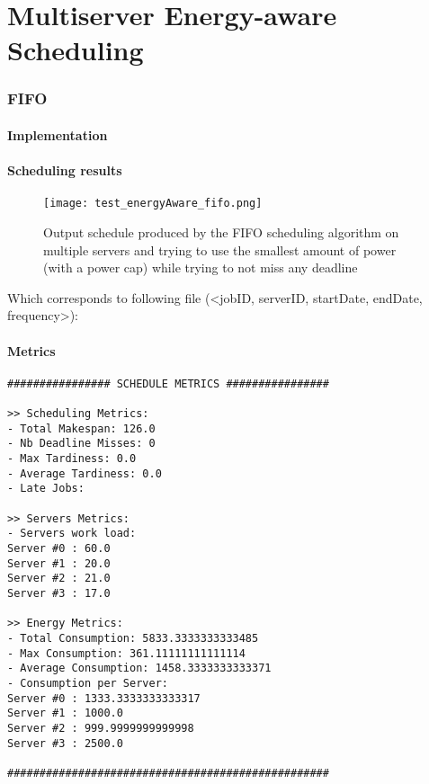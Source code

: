 \documentclass[./report.tex]{subfiles}
\begin{document}
\part{Multiserver Energy-aware Scheduling}


\newpage
\section{FIFO}
\subsection{Implementation}

\subsection{Scheduling results}
\begin{figure}[!h]
	\center
	\texttt{[image: test\_energyAware\_fifo.png]}
	\caption{Output schedule produced by the FIFO scheduling algorithm on multiple servers and trying to use the smallest amount of power (with a power cap) while trying to not miss any deadline}
	\label{fig:energyAware_fifo} 
\end{figure}

Which corresponds to following file (<jobID, serverID, startDate, endDate, frequency>):


\newpage
\subsection{Metrics}
\begin{lstlisting}[style=txt, caption={Metrics for FIFO on multiple energy aware servers}]
################ SCHEDULE METRICS ################

>> Scheduling Metrics: 
- Total Makespan: 126.0
- Nb Deadline Misses: 0
- Max Tardiness: 0.0
- Average Tardiness: 0.0
- Late Jobs: 

>> Servers Metrics: 
- Servers work load:
Server #0 : 60.0
Server #1 : 20.0
Server #2 : 21.0
Server #3 : 17.0

>> Energy Metrics: 
- Total Consumption: 5833.3333333333485
- Max Consumption: 361.11111111111114
- Average Consumption: 1458.3333333333371
- Consumption per Server: 
Server #0 : 1333.3333333333317
Server #1 : 1000.0
Server #2 : 999.9999999999998
Server #3 : 2500.0

##################################################
\end{lstlisting}
\end{document}
